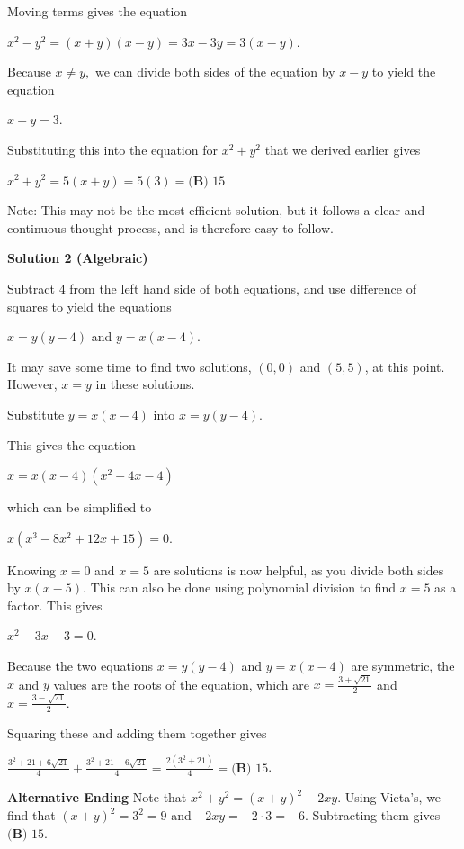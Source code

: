 \begin{enumerate}
 Moving terms gives the equation

 $x^2 - y^2 = (x + y)(x - y) = 3x - 3y = 3(x - y).$

 Because $x \neq y,$ we can divide both sides of the equation by $x - y$ to yield the equation

 $x + y = 3.$

 Substituting this into the equation for $x^2 + y^2$ that we derived earlier gives

 $x^2 + y^2 = 5 \left( x + y \right) = 5 \left( 3 \right) = \boxed{\textbf{(B) } 15}$

 Note: This may not be the most efficient solution, but it follows a clear and continuous thought process, and is therefore easy to follow.

 



\textbf{Solution 2 (Algebraic)}

Subtract $4$ from the left hand side of both equations, and use difference of squares to yield the equations

 $x = y(y-4)$  and  $y = x(x-4)$.

 It may save some time to find two solutions, $(0, 0)$ and $(5, 5)$, at this point. However, $x = y$ in these solutions.

 
Substitute $y = x(x-4)$ into $x = y(y-4)$.

 
This gives the equation

 $x = x(x-4)(x^2-4x-4)$

 which can be simplified to

 $x(x^3 - 8x^2 +12x + 15) = 0$.

 Knowing $x = 0$ and $x = 5$ are solutions is now helpful, as you divide both sides by $x(x-5)$. This can also be done using polynomial division to find $x = 5$ as a factor. This gives

 $x^2 - 3x -3 = 0$.

 Because the two equations $x = y(y-4)$ and $y = x(x-4)$ are symmetric, the $x$ and $y$ values are the roots of the equation, which are $x = \frac{3 + \sqrt{21}}{2}$ and $x = \frac{3 - \sqrt{21}}{2}$.

 Squaring these and adding them together gives

 $\frac{3^2 + 21 + 6\sqrt{21}}{4} + \frac{3^2 + 21 - 6\sqrt{21}}{4} = \frac{2(3^2 +21)}{4} = \boxed{\textbf{(B) } 15}$.

 \textbf{Alternative Ending} Note that $x^2+y^2 = (x+y)^2 - 2xy$. Using Vieta's, we find that $(x+y)^2 = 3^2 = 9$ and $-2xy = -2\cdot 3 = -6$. Subtracting them gives $\boxed{\textbf{(B) } 15}$.


\end{enumerate}
